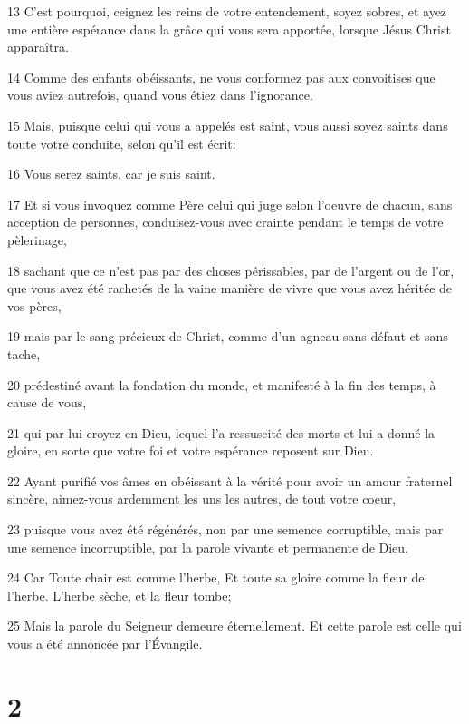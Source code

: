 \par 13 C'est pourquoi, ceignez les reins de votre entendement, soyez sobres, et ayez une entière espérance dans la grâce qui vous sera apportée, lorsque Jésus Christ apparaîtra.
\par 14 Comme des enfants obéissants, ne vous conformez pas aux convoitises que vous aviez autrefois, quand vous étiez dans l'ignorance.
\par 15 Mais, puisque celui qui vous a appelés est saint, vous aussi soyez saints dans toute votre conduite, selon qu'il est écrit:
\par 16 Vous serez saints, car je suis saint.
\par 17 Et si vous invoquez comme Père celui qui juge selon l'oeuvre de chacun, sans acception de personnes, conduisez-vous avec crainte pendant le temps de votre pèlerinage,
\par 18 sachant que ce n'est pas par des choses périssables, par de l'argent ou de l'or, que vous avez été rachetés de la vaine manière de vivre que vous avez héritée de vos pères,
\par 19 mais par le sang précieux de Christ, comme d'un agneau sans défaut et sans tache,
\par 20 prédestiné avant la fondation du monde, et manifesté à la fin des temps, à cause de vous,
\par 21 qui par lui croyez en Dieu, lequel l'a ressuscité des morts et lui a donné la gloire, en sorte que votre foi et votre espérance reposent sur Dieu.
\par 22 Ayant purifié vos âmes en obéissant à la vérité pour avoir un amour fraternel sincère, aimez-vous ardemment les uns les autres, de tout votre coeur,
\par 23 puisque vous avez été régénérés, non par une semence corruptible, mais par une semence incorruptible, par la parole vivante et permanente de Dieu.
\par 24 Car Toute chair est comme l'herbe, Et toute sa gloire comme la fleur de l'herbe. L'herbe sèche, et la fleur tombe;
\par 25 Mais la parole du Seigneur demeure éternellement. Et cette parole est celle qui vous a été annoncée par l'Évangile.

\chapter{2}

